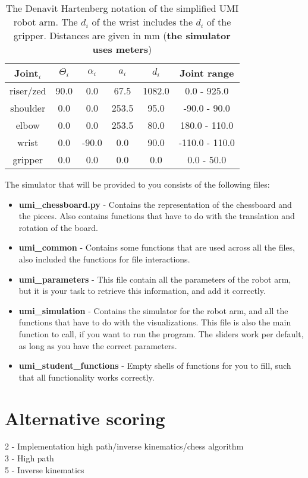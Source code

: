\documentclass{article}
\begin{document}
\begin{table}[]
    \centering
    \begin{tabular}{|c|c|c|c|c|c|} \hline
        Joint$_i$ & $\Theta_i$ & $\alpha_i$ & $a_i$ & $d_i$ & Joint range \\ \hline
        riser/zed & 90.0 & 0.0 & 67.5 & 1082.0 & 0.0 - 925.0 \\ \hline
        shoulder & 0.0 & 0.0 & 253.5 & 95.0 & -90.0 - 90.0 \\ \hline
        elbow & 0.0 & 0.0 & 253.5 & 80.0 & 180.0 - 110.0 \\ \hline
        wrist & 0.0 & -90.0 & 0.0 & 90.0 & -110.0 - 110.0 \\ \hline
        gripper & 0.0 & 0.0 & 0.0 & 0.0 & 0.0 - 50.0 \\ \hline
    \end{tabular}
    \caption{The Denavit Hartenberg notation of the simplified UMI robot arm. The $d_i$ of the wrist includes the $d_i$ of the gripper. Distances are given in mm (\textbf{the simulator uses meters})}
    \label{tab:denavite}
\end{table}

The simulator that will be provided to you consists of the following files:
\begin{itemize}
    \item \textbf{umi\_chessboard.py} - Contains the representation of the chessboard and the pieces. Also contains functions that have to do with the translation and rotation of the board.
    \item \textbf{umi\_common} - Contains some functions that are used across all the files, also included the functions for file interactions.
    \item \textbf{umi\_parameters} - This file contain all the parameters of the robot arm, but it is your task to retrieve this information, and add it correctly.
    \item \textbf{umi\_simulation} - Contains the simulator for the robot arm, and all the functions that have to do with the visualizations. This file is also the main function to call, if you want to run the program. The sliders work per default, as long as you have the correct parameters.
    \item \textbf{umi\_student\_functions} - Empty shells of functions for you to fill, such that all functionality works correctly.
\end{itemize}

\section*{Alternative scoring}
2 - Implementation high path/inverse kinematics/chess algorithm\\
3 - High path\\
5 - Inverse kinematics
\end{document}
